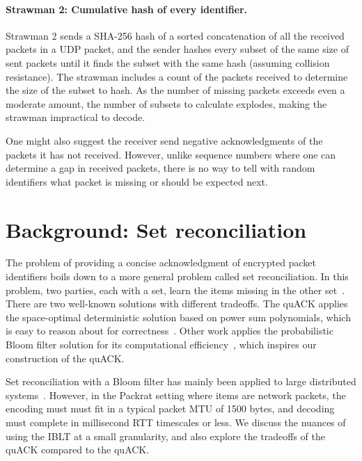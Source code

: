 \paragraph{Strawman 2: Cumulative hash of every identifier.}
Strawman 2 sends a SHA-256 hash of a sorted concatenation of all the
received packets in a UDP packet, and the sender hashes every subset of the same size of
sent packets until it finds the subset with the same hash (assuming collision resistance).
The strawman includes
a count of the packets received to determine the size of the subset to hash.
As the number of missing packets exceeds even a moderate amount, the number
of subsets to calculate explodes, making the strawman impractical to decode.

\smallskip

One might also suggest the receiver send negative acknowledgments of the packets
it has not received. However, unlike sequence numbers where one can
determine a gap in received packets, there is no way to tell with random
identifiers what packet is missing or should be expected next.

\section{Background: Set reconciliation}
\label{sec:quack:background}

The problem of providing a concise acknowledgment of encrypted packet identifiers
boils down to a more general problem called set reconciliation. In this problem,
two parties, each with a set, learn the items missing in the other
set~\cite{minsky2003set,eppstein2011straggler}.
There are two well-known solutions with different tradeoffs. The quACK
applies the space-optimal deterministic solution based on
power sum polynomials, which is easy to reason about for correctness~\cite{yuan2024sidekick}.
Other work applies the probabilistic Bloom filter solution
for its computational efficiency~\cite{yang2024practical,summermatter2021byzantine},
which inspires our construction of the quACK.

Set reconciliation with a Bloom filter has mainly been applied to large distributed systems~\cite
{yang2024practical,summermatter2021byzantine}. However, in the Packrat setting
where items are network packets, the encoding must must fit in a typical packet
MTU of 1500 bytes, and decoding must complete in millisecond RTT timescales or
less. We discuss the nuances of using the IBLT at a small granularity, and
also explore the tradeoffs of the quACK compared to the quACK.

